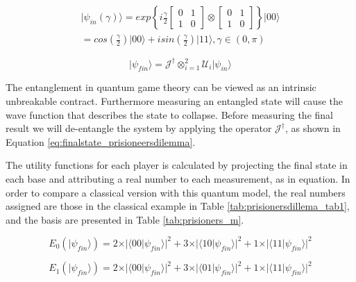 \begin{equation}
\label{eq:estado_inicial_prisioneiro}
\begin{split}
\vert\psi_{in}(\gamma)\rangle=exp\left\{ i\frac{\gamma}{2}\left[\begin{array}{cc}
0 & 1\\
1 & 0
\end{array}\right]\otimes\left[\begin{array}{cc}
0 & 1\\
1 & 0
\end{array}\right]\right\} \vert00\rangle \\
=cos(\frac{\gamma}{2})\vert00\rangle+isin(\frac{\gamma}{2})\vert11\rangle,\gamma\in(0,\pi)
\end{split}
\end{equation}

\begin{equation}
\vert\psi_{fin}\rangle= \mathcal{J}^{\dagger} \otimes_{i=1}^{2}\mathcal{U}_{i}\vert\psi_{in}\rangle
\label{eq:finalstate_prisioneersdilemma}
\end{equation}

The entanglement in quantum game theory can be viewed as an intrinsic unbreakable contract. Furthermore measuring an entangled state will cause the wave function that describes the state to collapse. Before measuring the final result we will de-entangle the system by applying the operator $\mathcal{J}^{\dagger}$, as shown in Equation \eqref{eq:finalstate_prisioneersdilemma}.

The utility functions for each player is calculated by projecting the final state in each base and attributing a real number to each measurement, as in equation.
In order to compare a classical version with this quantum model, the real numbers assigned are those in the classical example in Table \ref{tab:prisionersdillema_tab1}, and the basis are presented in Table \ref{tab:prisioners_m}.

\begin{equation}
E_{0}(\vert\psi_{fin}\rangle)=2\times\vert\langle00\vert\psi_{fin}\rangle\vert^{2}+3\times\vert\langle10\vert\psi_{fin}\rangle\vert^{2}+1\times\vert\langle11\vert\psi_{fin}\rangle\vert^{2}
\end{equation}


\begin{equation}
E_{1}(\vert\psi_{fin}\rangle)=2\times\vert\langle00\vert\psi_{fin}\rangle\vert^{2}+3\times\vert\langle01\vert\psi_{fin}\rangle\vert^{2}+1\times\vert\langle11\vert\psi_{fin}\rangle\vert^{2}
\end{equation}



